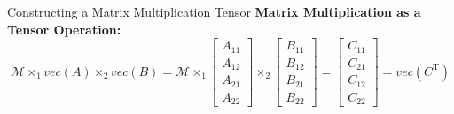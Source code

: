 \documentclass[final,hyperref={pdfpagelabels=false}]{beamer}
\begin{document}
\begin{frame}[t]
\begin{columns}[t]
\begin{column}{.5\linewidth}
        \begin{block}{Constructing a Matrix Multiplication Tensor}
            \textbf{Matrix Multiplication as a Tensor Operation:}
            \begin{equation*}
                \mathcal{M} \times_1 vec(A) \times_2 vec(B) = \mathcal{M} \times_1
                \begin{bmatrix}
                    A_{11}\\
                    A_{12}\\
                    A_{21}\\
                    A_{22}
                \end{bmatrix}
                \times_2
                \begin{bmatrix}
                    B_{11}\\
                    B_{12}\\
                    B_{21}\\
                    B_{22}
                \end{bmatrix}
                =
                \begin{bmatrix}
                    C_{11}\\
                    C_{21}\\
                    C_{12}\\
                    C_{22}
                \end{bmatrix}
                = vec(C^\text{T})
            \end{equation*}

            \begin{center}
                \setlength{\arraycolsep}{18pt} %
                \renewcommand{\arraystretch}{1} %
    

\end{center}
\end{block}
\end{column}
\end{columns}
\end{frame}
\end{document}
